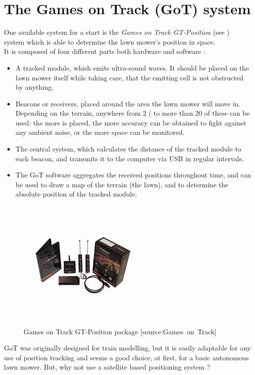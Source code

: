\section{The Games on Track (GoT) system}
One available system for a start is the \emph{Games on Track GT-Position} (see ) system which is able to determine the lawn mower's position in space.\\
%
It is composed of four different parts both hardware and software \cite{GOTWebsitePos} :
\begin{itemize}
	\item A tracked module, which emits ultra-sound waves. It should be placed on the lawn mower itself while taking care, that the emitting cell is not obstructed by anything.
	\item Beacons or receivers, placed around the area the lawn mower will move in. Depending on the terrain, anywhere from 2 ( to more than 20 of these can be used: the more is placed, the more accuracy can be obtained to fight against any ambient noise, or the more space can be monitored.
	\item The central system, which calculates the distance of the tracked module to each beacon, and transmits it to the computer via USB in regular intervals.
	\item The GoT software aggregates the received positions throughout time, and can be used to draw a map of the terrain (the lawn), and to determine the absolute position of the tracked module.
\end{itemize}

\begin{figure}[H]
\centering
\includegraphics[scale=1.1]{figures/gotSystem.jpg} 
\caption{Games on Track GT-Position package [source:Games\ on\ Track]} 
\label{fig:gotsystem}
\end{figure}
\noindent

GoT was originally designed for train modelling, but it is easily adaptable for any use of position tracking and seems a good choice, at first, for a basic autonomous lawn mower.
But, why not use a satellite based positioning system ?
